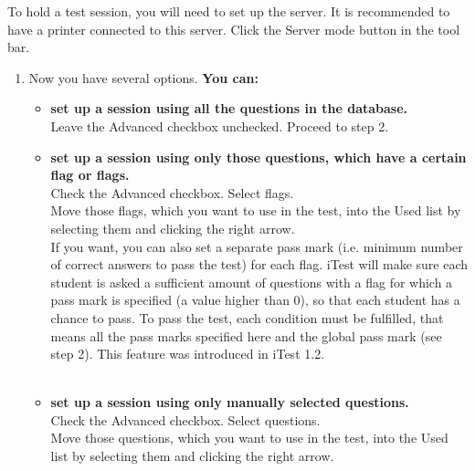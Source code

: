 To hold a test session, you will need to set up the server.
It is recommended to have a printer connected to this server.
Click the Server mode button in the tool bar.

\begin{enumerate}
\item Now you have several options. {\bf You can:}

\begin{itemize}
\item {\bf set up a session using all the questions in the database.}\\
Leave the Advanced checkbox unchecked. 
Proceed to step 2.

\item {\bf set up a session using only those questions, which have a certain flag or flags.}\\
Check the Advanced checkbox. 
Select flags. \\
Move those flags, which you want to use in the test, into the Used list by selecting them and clicking the right arrow.
\\
If you want, you can also set a separate pass mark (i.e. minimum number of correct answers to pass the test) for each flag.
iTest will make sure each student is asked a sufficient amount of questions with a flag for which a pass mark is specified (a value higher than 0), so that each student has a chance to pass.
To pass the test, each condition must be fulfilled, that means all the pass marks specified here and the global pass mark (see step 2).
This feature was introduced in iTest 1.2.\\\\

\item {\bf set up a session using only manually selected questions.}\\
Check the Advanced checkbox. 
Select questions. \\
Move those questions, which you want to use in the test, into the Used list by selecting them and clicking the right arrow.
\end{itemize}


\end{enumerate}

